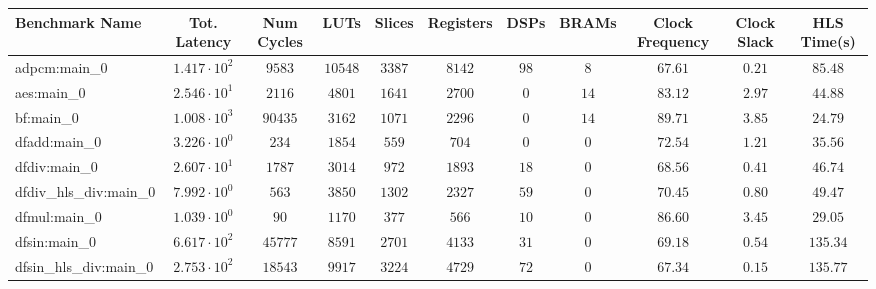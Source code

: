 \begin{tabular}{|l|c|c|c|c|c|c|c|c|c|c|}
\hline
Benchmark Name          & Tot. Latency           & Num Cycles & LUTs      & Slices    & Registers & DSPs    & BRAMs   & Clock Frequency & Clock Slack & HLS Time(s) \\
\hline
adpcm:main\_0           & $ 1.417 \cdot 10^{2} $ & $ 9583   $ & $ 10548 $ & $ 3387  $ & $ 8142  $ & $ 98  $ & $ 8   $ & $ 67.61       $ & $ 0.21    $ & $ 85.48   $ \\
aes:main\_0             & $ 2.546 \cdot 10^{1} $ & $ 2116   $ & $ 4801  $ & $ 1641  $ & $ 2700  $ & $ 0   $ & $ 14  $ & $ 83.12       $ & $ 2.97    $ & $ 44.88   $ \\
bf:main\_0              & $ 1.008 \cdot 10^{3} $ & $ 90435  $ & $ 3162  $ & $ 1071  $ & $ 2296  $ & $ 0   $ & $ 14  $ & $ 89.71       $ & $ 3.85    $ & $ 24.79   $ \\
dfadd:main\_0           & $ 3.226 \cdot 10^{0} $ & $ 234    $ & $ 1854  $ & $ 559   $ & $ 704   $ & $ 0   $ & $ 0   $ & $ 72.54       $ & $ 1.21    $ & $ 35.56   $ \\
dfdiv:main\_0           & $ 2.607 \cdot 10^{1} $ & $ 1787   $ & $ 3014  $ & $ 972   $ & $ 1893  $ & $ 18  $ & $ 0   $ & $ 68.56       $ & $ 0.41    $ & $ 46.74   $ \\
dfdiv\_hls\_div:main\_0 & $ 7.992 \cdot 10^{0} $ & $ 563    $ & $ 3850  $ & $ 1302  $ & $ 2327  $ & $ 59  $ & $ 0   $ & $ 70.45       $ & $ 0.80    $ & $ 49.47   $ \\
dfmul:main\_0           & $ 1.039 \cdot 10^{0} $ & $ 90     $ & $ 1170  $ & $ 377   $ & $ 566   $ & $ 10  $ & $ 0   $ & $ 86.60       $ & $ 3.45    $ & $ 29.05   $ \\
dfsin:main\_0           & $ 6.617 \cdot 10^{2} $ & $ 45777  $ & $ 8591  $ & $ 2701  $ & $ 4133  $ & $ 31  $ & $ 0   $ & $ 69.18       $ & $ 0.54    $ & $ 135.34  $ \\
dfsin\_hls\_div:main\_0 & $ 2.753 \cdot 10^{2} $ & $ 18543  $ & $ 9917  $ & $ 3224  $ & $ 4729  $ & $ 72  $ & $ 0   $ & $ 67.34       $ & $ 0.15    $ & $ 135.77  $ \\

\end{tabular}

